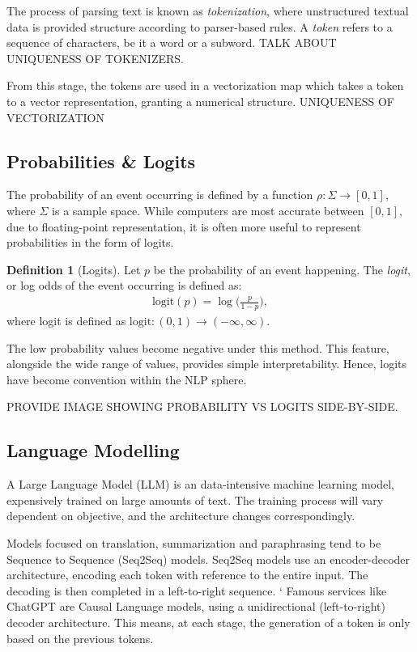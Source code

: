 \documentclass{l4proj}
\theoremstyle{definition}
\newtheorem{definition}{Definition}[section]
\begin{document}
        The process of parsing text is known as \textit{tokenization}, where unstructured textual data is provided structure according to parser-based rules. A \textit{token} refers to a sequence of characters, be it a word or a subword. TALK ABOUT UNIQUENESS OF TOKENIZERS. 
        
        From this stage, the tokens are used in a vectorization map which takes a token to a vector representation, granting a numerical structure. UNIQUENESS OF VECTORIZATION  
        
    \subsection{Probabilities \& Logits}
        The probability of an event occurring is defined by a function $\rho: \Sigma \rightarrow [0,1]$, where $\Sigma$ is a sample space. While computers are most accurate between $[0,1]$, due to floating-point representation, it is often more useful to represent probabilities in the form of logits.

        \begin{definition}[Logits]
            Let $p$ be the probability of an event happening. The \textit{logit}, or log odds of the event occurring is defined as: 
            \begin{align}
                \text{logit}(p) = \log\bigg(\frac{p}{1-p}\bigg),
            \end{align}
            where logit is defined as $\text{logit}: (0,1) \rightarrow (-\infty, \infty)$.
        \end{definition}
        
        The low probability values become negative under this method. This feature, alongside the wide range of values, provides simple interpretability. Hence, logits have become convention within the NLP sphere.

        PROVIDE IMAGE SHOWING PROBABILITY VS LOGITS SIDE-BY-SIDE.

    \subsection{Language Modelling}
        A Large Language Model (LLM) is an data-intensive machine learning model, expensively trained on large amounts of text. The training process will vary dependent on objective, and the architecture changes correspondingly.

        Models focused on translation, summarization and paraphrasing tend to be Sequence to Sequence (Seq2Seq) models. Seq2Seq models use an encoder-decoder architecture, encoding each token with reference to the entire input. The decoding is then completed in a left-to-right sequence.
`
        Famous services like ChatGPT are Causal Language models, using a unidirectional (left-to-right) decoder architecture. This means, at each stage, the generation of a token is only based on the previous tokens. 
\end{document}

